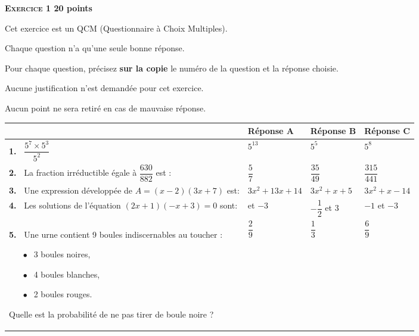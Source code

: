 \textbf{{\large \textsc{Exercice 1}} \hfill 20 points}

\medskip

Cet exercice est un QCM (Questionnaire à Choix Multiples).

Chaque question n'a qu'une seule bonne réponse.

Pour chaque question, précisez \textbf{sur la copie} le numéro de la question et la réponse choisie.

Aucune justification n'est demandée pour cet exercice.

Aucun point ne sera retiré en cas de mauvaise réponse.

\begin{center}
\renewcommand\arraystretch{2}
\begin{tabularx}{\linewidth}{|m{5cm}|*{3}{>{\centering \arraybackslash}X|}}\cline{2-4}
\multicolumn{1}{c|}{~}&\textbf{Réponse A}&\textbf{Réponse B}&\textbf{Réponse C}\\ \hline
\textbf{1.~} $\dfrac{5^7 \times 5^3}{5^2}$&$5^{13}$&$5^5$&$5^8$\\ \hline
\textbf{2.~} La fraction irréductible égale à $\dfrac{630}{882}$ est :&$\dfrac57$&$\dfrac{35}{49}$&$\dfrac{315}{441}$\\ \hline
\textbf{3.~} Une expression développée de 
$A = (x - 2)(3x + 7)$ est:&$3x^2 +13x +14$&$3x^2 +x +5$&$3x^2 +x -14$\\ \hline
\textbf{4.~} 
Les solutions de l'équation $(2x + 1)(- x + 3) = 0$ sont:&2 et $- 3$&$- \dfrac12$ et 3&$- 1$ et $- 3$\\ \hline
\textbf{5.~} 
Une urne contient 9 boules indiscernables au toucher :
\begin{itemize}
\item[$\bullet~~$]3 boules noires,
\item[$\bullet~~$]4 boules blanches,
\item[$\bullet~~$]2 boules rouges.
\end{itemize}

Quelle est la probabilité de ne pas tirer de boule noire ?&$\dfrac29$&$\dfrac13$&$\dfrac69$\\ \hline
\end{tabularx}
\renewcommand\arraystretch{1}
\end{center}

\bigskip

